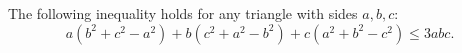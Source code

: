 The following inequality holds for any triangle with sides $a, b, c$:
\[ a(b^2 + c^2 - a^2) + b(c^2 + a^2 - b^2) + c(a^2 + b^2 - c^2) \leq 3abc. \]
